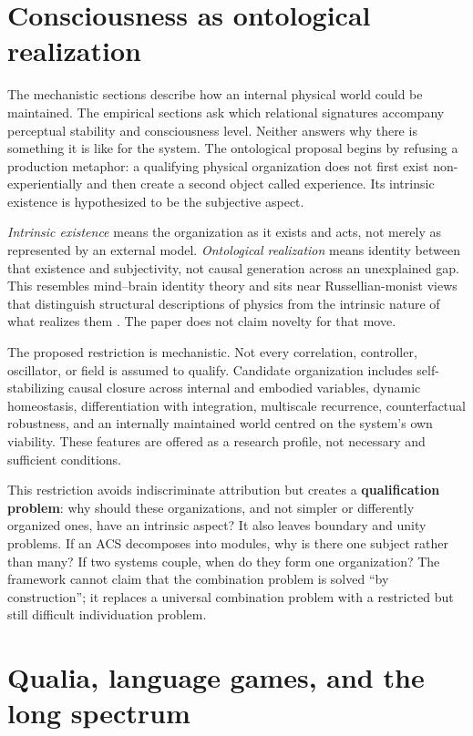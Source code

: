 \documentclass[
  11pt,
  a4paper,
]{article}
\begin{document}
\section{Consciousness as ontological
realization}\label{consciousness-as-ontological-realization}

The mechanistic sections describe how an internal physical world could
be maintained. The empirical sections ask which relational signatures
accompany perceptual stability and consciousness level. Neither answers
why there is something it is like for the system. The ontological
proposal begins by refusing a production metaphor: a qualifying physical
organization does not first exist non-experientially and then create a
second object called experience. Its intrinsic existence is hypothesized
to be the subjective aspect.

\emph{Intrinsic existence} means the organization as it exists and acts,
not merely as represented by an external model. \emph{Ontological
realization} means identity between that existence and subjectivity, not
causal generation across an unexplained gap. This resembles mind--brain
identity theory \citep{smart1959} and sits near Russellian-monist views
that distinguish structural descriptions of physics from the intrinsic
nature of what realizes them \citep{strawson2006, chalmers2013}. The
paper does not claim novelty for that move.

The proposed restriction is mechanistic. Not every correlation,
controller, oscillator, or field is assumed to qualify. Candidate
organization includes self-stabilizing causal closure across internal
and embodied variables, dynamic homeostasis, differentiation with
integration, multiscale recurrence, counterfactual robustness, and an
internally maintained world centred on the system's own viability. These
features are offered as a research profile, not necessary and sufficient
conditions.

This restriction avoids indiscriminate attribution but creates a
\textbf{qualification problem}: why should these organizations, and not
simpler or differently organized ones, have an intrinsic aspect? It also
leaves boundary and unity problems. If an ACS decomposes into modules,
why is there one subject rather than many? If two systems couple, when
do they form one organization? The framework cannot claim that the
combination problem is solved ``by construction''; it replaces a
universal combination problem with a restricted but still difficult
individuation problem.

\section{Qualia, language games, and the long
spectrum}\label{qualia-language-games-and-the-long-spectrum}
\end{document}
